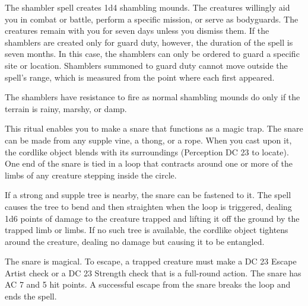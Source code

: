 \spellrng{\rngmed}
\begin{spelleffect}
The shambler spell creates 1d4 shambling mounds. The creatures willingly aid you in combat or battle, perform a specific mission, or serve as bodyguards. The creatures remain with you for seven days unless you dismiss them. If the shamblers are created only for guard duty, however, the duration of the spell is seven months. In this case, the shamblers can only be ordered to guard a specific site or location. Shamblers summoned to guard duty cannot move outside the spell's range, which is measured from the point where each first appeared. 
\par The shamblers have resistance to fire as normal shambling mounds do only if the terrain is rainy, marshy, or damp.
\end{spelleffect}

\begin{spelleffect}
This ritual enables you to make a snare that functions as a magic trap. The snare can be made from any supple vine, a thong, or a rope. When you cast  upon it, the cordlike object blends with its surroundings (Perception DC 23 to locate). One end of the snare is tied in a loop that contracts around one or more of the limbs of any creature stepping inside the circle.
\par If a strong and supple tree is nearby, the snare can be fastened to it. The spell causes the tree to bend and then straighten when the loop is triggered, dealing 1d6 points of damage to the creature trapped and lifting it off the ground by the trapped limb or limbs. If no such tree is available, the cordlike object tightens around the creature, dealing no damage but causing it to be entangled.
\par The snare is magical. To escape, a trapped creature must make a DC 23 Escape Artist check or a DC 23 Strength check that is a full-round action. The snare has AC 7 and 5 hit points. A successful escape from the snare breaks the loop and ends the spell.
\end{spelleffect}

